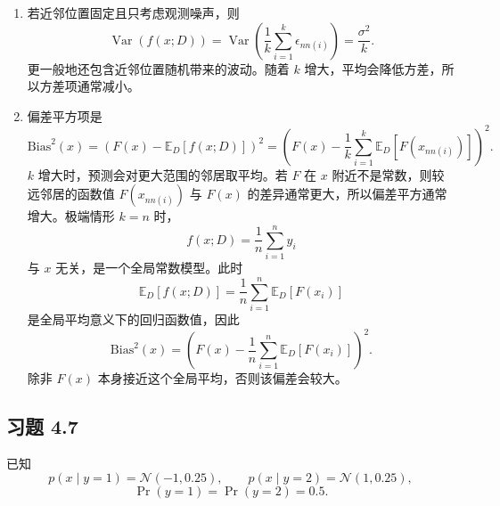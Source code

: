 \documentclass[UTF8,a4paper,12pt]{ctexart}
\newcommand{\E}{\mathbb{E}}
\newcommand{\Var}{\operatorname{Var}}
\newcommand{\Prb}{\operatorname{Pr}}
\newcommand{\Normal}{\mathcal{N}}
\begin{document}
\begin{enumerate}
  \item 若近邻位置固定且只考虑观测噪声，则
  \[
      \Var(f(x;D))=\Var\left(\frac{1}{k}\sum_{i=1}^k \epsilon_{nn(i)}\right)
      =\frac{\sigma^2}{k}.
  \]
  更一般地还包含近邻位置随机带来的波动。随着 $k$ 增大，平均会降低方差，所以方差项通常减小。

  \item 偏差平方项是
  \[
      \mathrm{Bias}^2(x)
      =
      \left(
      F(x)-
      \E_D[f(x;D)]
      \right)^2
      =
      \left(
      F(x)-
      \frac{1}{k}\sum_{i=1}^k \E_D[F(x_{nn(i)})]
      \right)^2.
  \]
  $k$ 增大时，预测会对更大范围的邻居取平均。若 $F$ 在 $x$ 附近不是常数，则较远邻居的函数值 $F(x_{nn(i)})$ 与 $F(x)$ 的差异通常更大，所以偏差平方通常增大。极端情形 $k=n$ 时，
  \[
      f(x;D)=\frac{1}{n}\sum_{i=1}^n y_i
  \]
  与 $x$ 无关，是一个全局常数模型。此时
  \[
      \E_D[f(x;D)]
      =
      \frac{1}{n}\sum_{i=1}^n \E_D[F(x_i)]
  \]
  是全局平均意义下的回归函数值，因此
  \[
      \mathrm{Bias}^2(x)
      =
      \left(
      F(x)-\frac{1}{n}\sum_{i=1}^n \E_D[F(x_i)]
      \right)^2.
  \]
  除非 $F(x)$ 本身接近这个全局平均，否则该偏差会较大。
\end{enumerate}

\subsection*{习题 4.7}

已知
\[
    p(x\mid y=1)=\Normal(-1,0.25),\qquad
    p(x\mid y=2)=\Normal(1,0.25),
\]
\[
    \Prb(y=1)=\Prb(y=2)=0.5.
\]
\end{document}
